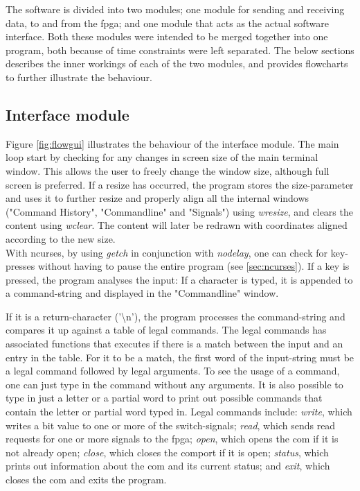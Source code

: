 \documentclass[main.tex]{subfiles}
\begin{document}
The software is divided into two modules; one module for sending and receiving data, to and from the \gls{fpga}; and one module that acts as the actual software interface. Both these modules were intended to be merged together into one program, both because of time constraints were left separated. The below sections describes the inner workings of each of the two modules, and provides flowcharts to further illustrate the behaviour.

\subsection{Interface module}
Figure \ref{fig:flowgui} illustrates the behaviour of the interface module. The main loop start by checking for any changes in screen size of the main terminal window. This allows the user to freely change the window size, although full screen is preferred. If a resize has occurred, the program stores the size-parameter and uses it to further resize and properly align all the internal windows ("Command History", "Commandline" and "Signals") using \textit{wresize}, and clears the content using \textit{wclear}. The content will later be redrawn with coordinates aligned according to the new size.\\

With ncurses, by using \textit{getch} in conjunction with \textit{nodelay}, one can check for key-presses without having to pause the entire program (see \ref{sec:ncurses}). If a key is pressed, the program analyses the input: If a character is typed, it is appended to a command-string and displayed in the "Commandline" window. 

If it is a return-character ('\textbackslash n'), the program processes the command-string and compares it up against a table of legal commands. The legal commands has associated functions that executes if there is a match between the input and an entry in the table. For it to be a match, the first word of the input-string must be a legal command followed by legal arguments. To see the usage of a command, one can just type in the command without any arguments. It is also possible to type in just a letter or a partial word to print out possible commands that contain the letter or partial word typed in. Legal commands include: \textit{write}, which writes a bit value to one or more of the switch-signals; \textit{read}, which sends read requests for one or more signals to the \gls{fpga}; \textit{open}, which opens the \gls{com} if it is not already open; \textit{close}, which closes the comport if it is open; \textit{status}, which prints out information about the \gls{com} and its current status; and \textit{exit}, which closes the \gls{com} and exits the program.
\end{document}
